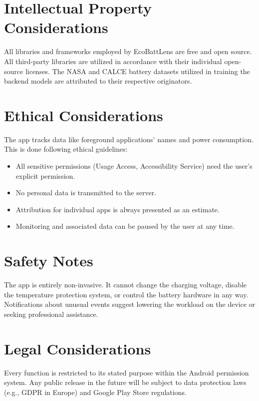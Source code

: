 \documentclass[12pt,a4paper]{report}
\begin{document}
\section{Intellectual Property Considerations}

All libraries and frameworks employed by EcoBattLens are free and open source.
All third-party libraries are utilized in accordance with their individual open-source licenses.
The NASA and CALCE battery datasets utilized in training the backend models are attributed
to their respective originators.

\section{Ethical Considerations}

The app tracks data like foreground applications' names and power consumption.
This is done following ethical guidelines:
\begin{itemize}[leftmargin=1.5em]
  \item All sensitive permissions (Usage Access, Accessibility Service) need
        the user's explicit permission.
  \item No personal data is transmitted to the server.
  \item Attribution for individual apps is always presented as an estimate.
  \item Monitoring and associated data can be paused by the user at any time.
\end{itemize}

\section{Safety Notes}

The app is entirely non-invasive. It cannot change the charging voltage, disable
the temperature protection system, or control the battery hardware in any way.
Notifications about unusual events suggest lowering the workload on the device or
seeking professional assistance.

\section{Legal Considerations}

Every function is restricted to its stated purpose within the Android permission system.
Any public release in the future will be subject to data protection laws (e.g., GDPR in Europe)
and Google Play Store regulations.
\end{document}
